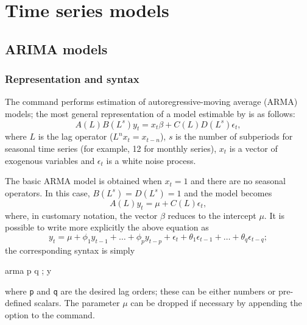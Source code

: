 \chapter{Time series models}
\label{chap:timeser}

\section{ARIMA models}
\label{arma-estimation}

\subsection{Representation and syntax}
\label{arma-repr}

The  command performs estimation of autoregressive-moving
average (ARMA) models; the most general representation of a model
estimable by  is as follows:
\begin{equation}
  \label{eq:general-arma}
  A(L) B(L^s) y_t = x_t \beta + C(L) D(L^s) \epsilon_t ,
\end{equation}
where $L$ is the lag operator ($L^n x_t = x_{t-n}$), $s$ is the
number of subperiods for seasonal time series (for example, 12 for
monthly series), $x_t$ is a vector of exogenous variables and
$\epsilon_t$ is a white noise process.

The basic ARMA model is obtained when $x_t = 1$ and there are no
seasonal operators. In this case, $B(L^s) = D(L^s) = 1$ and the model
becomes
\begin{equation}
  \label{eq:plain-arma}
  A(L) y_t = \mu + C(L) \epsilon_t ,
\end{equation}
where, in customary notation, the vector $\beta$ reduces to the
intercept $\mu$. It is possible to write more explicitly the above
equation as
\[
  y_t = \mu + \phi_1 y_{t-1} + \ldots + \phi_p y_{t-p} + 
  \epsilon_t + \theta_1 \epsilon_{t-1} + \ldots + \theta_q
  \epsilon_{t-q} ;
\]
the corresponding  syntax is simply
\begin{code}
  arma p q ; y
\end{code}
where \verb|p| and \verb|q| are the desired lag orders; these can be
either numbers or pre-defined scalars. The parameter $\mu$ can be
dropped if necessary by appending the option  to the command.

